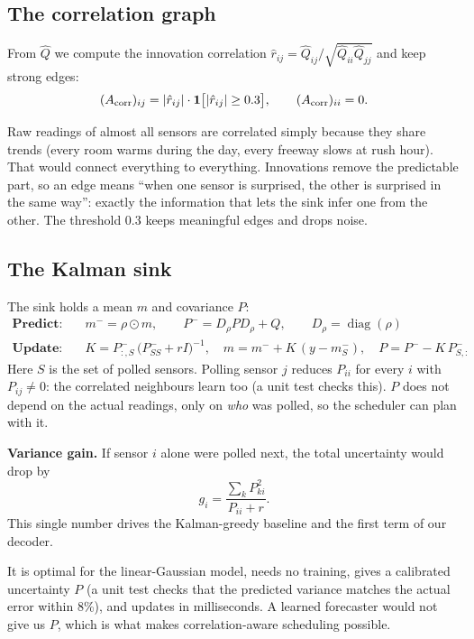 \subsection{The correlation graph}

From $\hat Q$ we compute the innovation correlation $\hat r_{ij}=\hat Q_{ij}/\sqrt{\hat Q_{ii}\hat Q_{jj}}$ and keep
strong edges:
\[
  (A_{\mathrm{corr}})_{ij} = |\hat r_{ij}|\cdot\mathbf 1\big[|\hat r_{ij}|\ge 0.3\big],\qquad (A_{\mathrm{corr}})_{ii}=0.
\]
\begin{whybox}
Raw readings of almost all sensors are correlated simply because they share trends (every room warms during the day,
every freeway slows at rush hour). That would connect everything to everything. Innovations remove the predictable
part, so an edge means ``when one sensor is surprised, the other is surprised in the same way'': exactly the
information that lets the sink infer one from the other. The threshold 0.3 keeps meaningful edges and drops noise.
\end{whybox}

\subsection{The Kalman sink}

The sink holds a mean $m$ and covariance $P$:
\begin{align*}
  \textbf{Predict:}\quad & m^- = \rho\odot m,\qquad P^- = D_\rho P D_\rho + Q,\qquad D_\rho=\operatorname{diag}(\rho)\\
  \textbf{Update:}\quad & K = P^-_{:,S}\,\big(P^-_{SS}+rI\big)^{-1},\quad m = m^- + K\,(y - m^-_S),\quad
  P = P^- - K\,P^-_{S,:}
\end{align*}
Here $S$ is the set of polled sensors. Polling sensor $j$ reduces $P_{ii}$ for every $i$ with $P_{ij}\neq0$: the
correlated neighbours learn too (a unit test checks this). $P$ does not depend on the actual readings, only on
\emph{who} was polled, so the scheduler can plan with it.

\textbf{Variance gain.} If sensor $i$ alone were polled next, the total uncertainty would drop by
\[
  g_i = \frac{\sum_k P_{ki}^2}{P_{ii}+r}.
\]
This single number drives the Kalman-greedy baseline and the first term of our decoder.

\begin{whybox}
It is optimal for the linear-Gaussian model, needs no training, gives a calibrated uncertainty $P$ (a unit test
checks that the predicted variance matches the actual error within 8\%), and updates in milliseconds. A learned
forecaster would not give us $P$, which is what makes correlation-aware scheduling possible.
\end{whybox}

